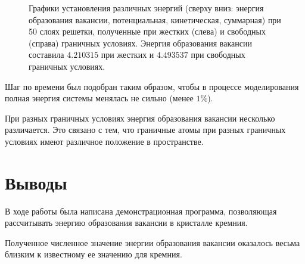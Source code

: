 \documentclass[12pt,a4paper]{article}
\begin{document}
\begin{figure}[!htb]
            \hspace{8pt}%
            \hspace{8pt}%
            \caption[]{Графики установления различных энергий (сверху вниз: энергия образования вакансии, потенциальная, кинетическая, суммарная) при 50 слоях решетки, полученные при жестких (слева) и свободных (справа) граничных условиях. Энергия образования вакансии составила $4.210315$ при жестких и $4.493537$ при свободных граничных условиях.}%
            \label{fig:2}%
        \end{figure}

        Шаг по времени был подобран таким образом, чтобы в процессе моделирования полная энергия системы менялась не сильно (менее $1\%$).

        При разных граничных условиях энергия образования вакансии несколько различается. Это связано с тем, что граничные атомы при разных граничных условиях имеют различное положение в пространстве.


    \section{Выводы}

        В ходе работы была написана демонстрационная программа, позволяющая рассчитывать энергию образования вакансии в кристалле кремния.

        Полученное численное значение энергии образования вакансии оказалось весьма близким к известному ее значению для кремния.


    \clearpage


    \nocite{*}
    
    
\end{document}
